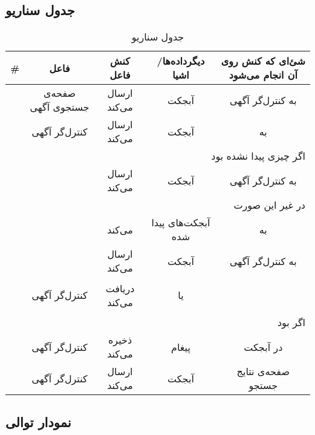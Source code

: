 \subsection{جدول سناریو}
\begin{table}[H]
	\caption{جدول سناریو }
	\begin{adjustbox}{width=\textwidth}
		\begin{tabular}{|c|c|c|c|c|}
			\hline								
			\# & فاعل & کنش فاعل & دیگرداده‌ها/اشیا & شئ‌ای که کنش روی آن انجام می‌شود \\
			\hline
			\hline
			\sstep &
			صفحه‌ی جستجو‌ی آگهی &
			ارسال می‌کند &
			آبجکت \json &
			به کنترل‌گر آگهی \\
			\hline
			\sstep &
			کنترل‌گر آگهی&
			ارسال می‌کند &
			آبجکت \json &
			به \gdm\\
			\hline
			\sstep &
			\multicolumn{4}{|r|}{اگر چیزی پیدا نشده بود}\\
			\hline
			\sstep &
			\gdm&
			ارسال می‌کند &
			آبجکت \none&
			به کنترل‌گر آگهی \\
			\hline
			\sstep &
			\multicolumn{4}{|r|}{در غیر این صورت}\\
			\hline
			\sstep &
			\gdm&
			\serialize می‌کند&
			آبجکت‌های پیدا شده &
			به \json \\
			\hline
			\sstep &
			\gdm &
			ارسال ‌می‌کند&
			آبجکت \json &
			به کنترل‌‌گر آگهی \\
			\hline
			\sstep &
			کنترل‌‌گر آگهی&
			دریافت می‌کند &
			\begin{inparaitem}
				\item \none 
			\end{inparaitem}
			یا 
			\begin{inparaitem}
				\item \json
			\end{inparaitem}
			&
			\\
			\hline
			\sstep &
			\multicolumn{4}{|r|}{اگر \none بود}
			\\
			\hline
			\sstep &
			کنترل‌گر آگهی &
			ذخیره می‌کند &
			پیغام \say{آگهی‌ای پیدا نشد}&
			در آبجکت \json \\
			\hline
			\sstep &
			کنترل‌گر آگهی &
			ارسال می‌کند &
			آبجکت \json &
			صفحه‌ی نتایج جستجو\\
			\hline
		\end{tabular}
	\end{adjustbox}
\end{table}
\setcounter{MainStepCounter}{0}
\setcounter{SenarioCounter}{0}
\subsection{نمودار توالی}


